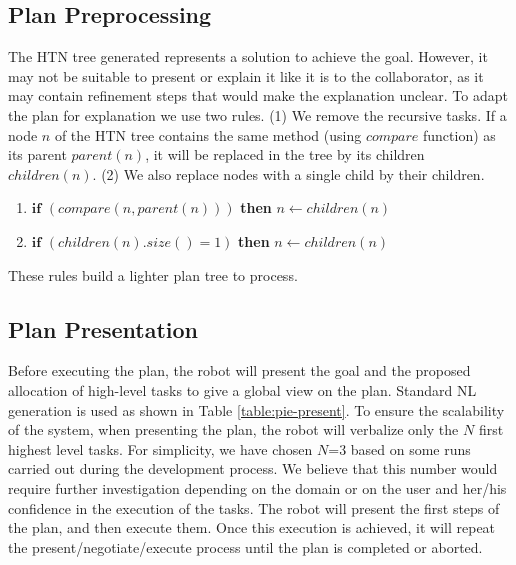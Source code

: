 \subsection{Plan Preprocessing}
The HTN tree generated represents a solution to achieve the goal. However, it may not be suitable to present or explain it like it is to the collaborator, as it may contain refinement steps that would make the explanation unclear. To adapt the plan for explanation we use two rules.
%
(1) We remove the recursive tasks. If a node $n$ of the HTN tree contains the same method (using $compare$ function) as its parent $parent(n)$, it will be replaced in the tree by its children $children(n)$. (2) We also replace nodes with a single child by their children.
\begin{enumerate}
\item $\textbf{if}$ $(compare(n, parent(n)))$ \textbf{then} $n \leftarrow children(n)$
\item $\textbf{if}$ $(children(n).size() = 1)$ \textbf{then} $n \leftarrow children(n)$
\end{enumerate}
These rules build a lighter plan tree to process.


\subsection{Plan Presentation}

Before executing the plan, the robot will present the goal and the proposed allocation of high-level tasks to give a global view on the plan. Standard NL generation is used as shown in Table \ref{table:pie-present}. 
To ensure the scalability of the system, when presenting the plan, the robot will verbalize only the $N$ first highest level tasks. For simplicity, we have chosen $N$=$3$ based on some runs carried out during the development process. We believe that this number would require further investigation depending on the domain or on the user and her/his confidence in the execution of the tasks. The robot will present the first steps of the plan, and then execute them. Once this execution is achieved, it will repeat the present/negotiate/execute process until the plan is completed or aborted.




